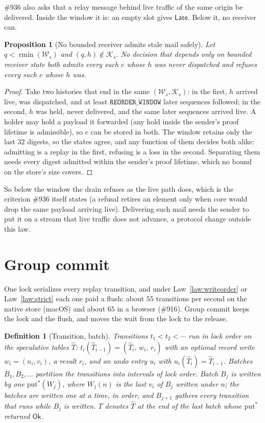 \documentclass[journal]{IEEEtran}
\newtheorem{definition}{Definition}
\newtheorem{proposition}{Proposition}
\newcommand{\rmin}{\operatorname{rmin}}
\newcommand{\Ok}{\mathsf{Ok}}
\newcommand{\K}{\mathcal{K}}
\newcommand{\W}{\mathcal{W}}
\newcommand{\issue}[1]{\#{#1}}
\begin{document}
\issue{936} also asks that a relay message behind live traffic of the same origin be
delivered.  Inside the window it is: an empty slot gives $\mathsf{Late}$.  Below it, no
receiver can.

\begin{proposition}[No bounded receiver admits stale mail safely]\label{prop:stale}
Let $q<\rmin(\W_s)$ and $(q,h)\notin\K_s$.  No decision that depends only on bounded
receiver state both admits every such $e$ whose $h$ was never dispatched and refuses every
such $e$ whose $h$ was.
\end{proposition}
\begin{proof}
Take two histories that end in the same $(\W_s,\K_s)$: in the first, $h$ arrived live,
was dispatched, and at least $\mathtt{REORDER\_WINDOW}$ later sequences followed; in the
second, $h$ was held, never delivered, and the same later sequences arrived live.  A holder
may hold a payload it forwarded (any hold inside the sender's proof lifetime is
admissible), so $e$ can be stored in both.  The window retains only the last $32$ digests,
so the states agree, and any function of them decides both alike: admitting is a replay in
the first, refusing is a loss in the second.  Separating them needs every digest admitted
within the sender's proof lifetime, which no bound on the store's size covers.
\end{proof}

So below the window the drain refuses as the live path does, which is the criterion
\issue{936} itself states (a refusal retires an element only when core would drop the same
payload arriving live).  Delivering such mail needs the sender to put it on a stream that
live traffic does not advance, a protocol change outside this law.

\section{Group commit}\label{sec:group}

One lock serializes every replay transition, and under Law~\ref{law:writeorder} or
Law~\ref{law:strict} each one paid a flush: about $55$ transitions per second on the native
store (macOS) and about $65$ in a browser (\issue{916}).  Group commit keeps the lock and
the flush, and moves the wait from the lock to the release.

\begin{definition}[Transition, batch]\label{def:batch}
Transitions $t_1<t_2<\cdots$ run in lock order on the \emph{speculative} tables $\hat T$:
$t_i(\hat T_{i-1})=(\hat T_i,\,w_i,\,r_i)$ with an optional record write
$w_i=(n_i,v_i)$, a result $r_i$, and an undo entry $u_i$ with $u_i(\hat T_i)=\hat T_{i-1}$.
Batches $B_1,B_2,\ldots$ partition the transitions into intervals of lock order.  Batch
$B_j$ is written by one $\mathrm{put}^{*}(W_j)$, where $W_j(n)$ is the last $v_i$ of $B_j$
written under $n$; the batches are written one at a time, in order, and $B_{j+1}$ gathers
every transition that runs while $B_j$ is written.  $T$ denotes $\hat T$ at the end of the
last batch whose $\mathrm{put}^{*}$ returned $\Ok$.
\end{definition}
\end{document}
